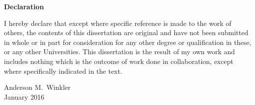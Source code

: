 \cleardoublepage
\newpage
{}
\vspace*{\fill}
\begin{center}
\begin{Large}
\textbf{Declaration}
\end{Large}
\end{center}

\noindent
I hereby declare that except where specific reference is made to the work of others, the contents of this dissertation are original and have not been submitted in whole or in part for consideration for any other degree or qualification in these, or any other Universities. This dissertation is the result of my own work and includes nothing which is the outcome of work done in collaboration, except where specifically indicated in the text.

\begin{flushright}
Anderson M.\ Winkler\\
January 2016
\end{flushright}

\vspace*{\fill}

%
%
%
%
%
%
%
%


